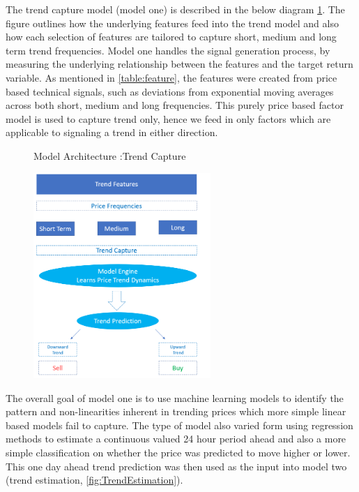 \documentclass[11pt]{article}
\begin{document}
The trend capture model (model one) is described in the below diagram \ref{fig:TrendCapture}. The figure outlines how the underlying features feed into the trend model and also how each selection of features are tailored to capture short, medium and long term trend frequencies. Model one handles the signal generation process, by measuring the underlying relationship between the features and the target return variable. As mentioned in \ref{table:feature}, the features were created from price based technical signals, such as deviations from exponential moving averages across both short, medium and long frequencies. This purely price based factor model is used to capture trend only, hence we feed in only factors which are applicable to signaling a trend in either direction.  

\begin{figure}[h]
    \centering
	\caption{Model Architecture :Trend Capture}    
	\includegraphics[width=0.6\textwidth]{TrendCapture}
    \label{fig:TrendCapture}
     \caption*{}
\end{figure}
 The overall goal of model one is to use machine learning models to identify the pattern and non-linearities inherent in trending prices which more simple linear based models fail to capture.  The type of model also varied form using regression methods to estimate a continuous valued 24 hour period ahead and also a more simple classification on whether the price was predicted to move higher or lower. This one day ahead trend prediction was then used as the input into model two (trend estimation, \ref{fig:TrendEstimation}).
\end{document}
